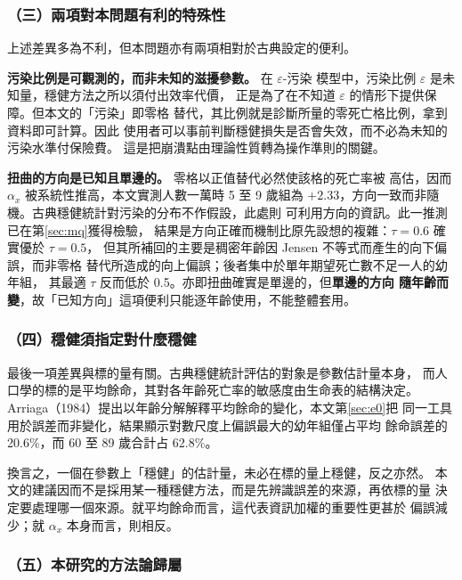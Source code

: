 \documentclass[UTF8, fontset=macnew, a4paper, 12pt]{ctexart}
\newcommand{\cn}[1]{\ding{\number\numexpr171+#1\relax}}
\begin{document}
\subsubsection{（三）兩項對本問題有利的特殊性}

上述差異多為不利，但本問題亦有兩項相對於古典設定的便利。

\textbf{污染比例是可觀測的，而非未知的滋擾參數。} 在 $\varepsilon$-污染
模型中，污染比例 $\varepsilon$ 是未知量，穩健方法之所以須付出效率代價，
正是為了在不知道 $\varepsilon$ 的情形下提供保障。但本文的「污染」即零格
替代，其比例就是診斷\cn{2}所量的零死亡格比例，拿到資料即可計算。因此
使用者可以事前判斷穩健損失是否會失效，而不必為未知的污染水準付保險費。
這是把崩潰點由理論性質轉為操作準則的關鍵。

\textbf{扭曲的方向是已知且單邊的。} 零格以正值替代必然使該格的死亡率被
高估，因而 $\alpha_x$ 被系統性推高，本文實測人數一萬時 5 至 9 歲組為
$+2.33$，方向一致而非隨機。古典穩健統計對污染的分布不作假設，此處則
可利用方向的資訊。此一推測已在第\ref{sec:mq}獲得檢驗，
結果是方向正確而機制比原先設想的複雜：$\tau=0.6$ 確實優於 $\tau=0.5$，
但其所補回的主要是稠密年齡因 Jensen 不等式而產生的向下偏誤，而非零格
替代所造成的向上偏誤；後者集中於單年期望死亡數不足一人的幼年組，
其最適 $\tau$ 反而低於 0.5。亦即扭曲確實是單邊的，但\textbf{單邊的方向
隨年齡而變}，故「已知方向」這項便利只能逐年齡使用，不能整體套用。

\subsubsection{（四）穩健須指定對什麼穩健}

最後一項差異與標的量有關。古典穩健統計評估的對象是參數估計量本身，
而人口學的標的是平均餘命，其對各年齡死亡率的敏感度由生命表的結構決定。
Arriaga（1984）提出以年齡分解解釋平均餘命的變化，本文第\ref{sec:e0}把
同一工具用於誤差而非變化，結果顯示對數尺度上偏誤最大的幼年組僅占平均
餘命誤差的 20.6\%，而 60 至 89 歲合計占 62.8\%。

換言之，一個在參數上「穩健」的估計量，未必在標的量上穩健，反之亦然。
本文的建議因而不是採用某一種穩健方法，而是先辨識誤差的來源，再依標的量
決定要處理哪一個來源。就平均餘命而言，這代表資訊加權的重要性更甚於
偏誤減少；就 $\alpha_x$ 本身而言，則相反。

\subsubsection{（五）本研究的方法論歸屬}
\end{document}

